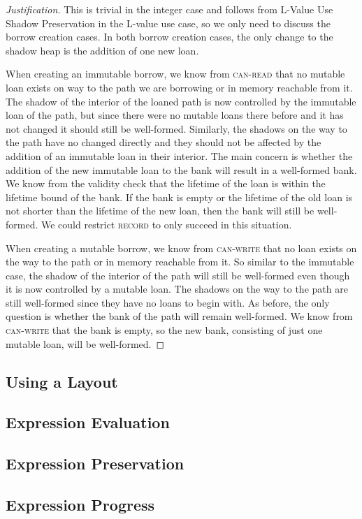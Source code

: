\begin{proof}[Justification]
  This is trivial in the integer case and follows from L-Value Use Shadow Preservation
  in the L-value use case, so we only need to discuss the borrow creation cases.
  In both borrow creation cases, the only change to the shadow heap is the addition of
  one new loan.

  When creating an immutable borrow, we know from \textsc{can-read} that
  no mutable loan exists on way to the path we are borrowing or in memory reachable from it.
  The shadow of the interior of the loaned path is now controlled by the immutable loan
  of the path, but since there were no mutable loans there before and it has not changed
  it should still be well-formed. Similarly, the shadows on the way to the path have no changed
  directly and they should not be affected by the addition of an immutable loan in their
  interior. The main concern is whether the addition of the new immutable loan to the bank 
  will result in a well-formed bank. We know from the validity check that the lifetime
  of the loan is within the lifetime bound of the bank. If the bank is empty or
  the lifetime of the old loan is not shorter than the lifetime of the new loan, then
  the bank will still be well-formed. We could restrict \textsc{record} to only succeed
  in this situation.

  When creating a mutable borrow, we know from \textsc{can-write} that
  no loan exists on the way to the path or in memory reachable from it.
  So similar to the immutable case, the shadow of the interior of the path will still
  be well-formed even though it is now controlled by a mutable loan.
  The shadows on the way to the path are still well-formed since they have no loans to begin with.
  As before, the only question is whether the bank of the path will remain well-formed.
  We know from \textsc{can-write} that the bank is empty, so the new bank, consisting of
  just one mutable loan, will be well-formed.
\end{proof}

\subsection*{Using a Layout}

\subsection*{Expression Evaluation}

\subsection*{Expression Preservation}

\subsection*{Expression Progress}
